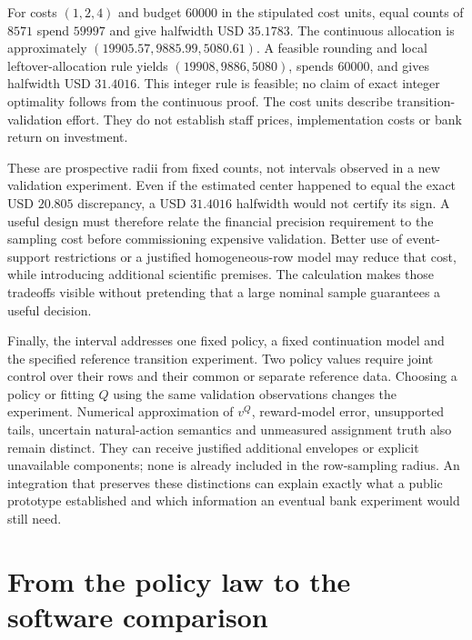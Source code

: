 For costs $(1,2,4)$ and budget $60000$ in the stipulated cost units, equal
counts of $8571$ spend $59997$ and give halfwidth USD $35.1783$. The
continuous allocation is approximately $(19905.57,9885.99,5080.61)$.
A feasible rounding and local leftover-allocation rule yields
$(19908,9886,5080)$, spends $60000$, and gives halfwidth USD $31.4016$.
This integer rule is feasible; no claim of exact integer optimality follows
from the continuous proof. The cost units describe transition-validation
effort. They do not establish staff prices, implementation costs or bank
return on investment.~\citep{exec17_s5_occupied}

These are prospective radii from fixed counts, not intervals observed in a
new validation experiment. Even if the estimated center happened to equal
the exact USD $20.805$ discrepancy, a USD $31.4016$ halfwidth would not
certify its sign. A useful design must therefore relate the financial
precision requirement to the sampling cost before commissioning expensive
validation. Better use of event-support restrictions or a justified
homogeneous-row model may reduce that cost, while introducing additional
scientific premises. The calculation makes those tradeoffs visible without
pretending that a large nominal sample guarantees a useful decision.

Finally, the interval addresses one fixed policy, a fixed continuation model
and the specified reference transition experiment. Two policy values require
joint control over their rows and their common or separate reference data.
Choosing a policy or fitting $Q$ using the same validation observations
changes the experiment. Numerical approximation of $v^Q$, reward-model
error, unsupported tails, uncertain natural-action semantics and unmeasured
assignment truth also remain distinct. They can receive justified additional
envelopes or explicit unavailable components; none is already included in
the row-sampling radius. An integration that preserves these distinctions
can explain exactly what a public prototype established and which
information an eventual bank experiment would still need.




\section{From the policy law to the software comparison}
\label{exec17:s5-end}

